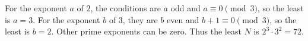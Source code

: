 For the exponent $a$ of $2$, the conditions are $a$ odd and $a\equiv0\pmod3$, so the least is $a=3$. For the exponent $b$ of $3$, they are $b$ even and $b+1\equiv0\pmod3$, so the least is $b=2$. Other prime exponents can be zero. Thus the least $N$ is $2^3\cdot3^2=\boxed{72}$.
